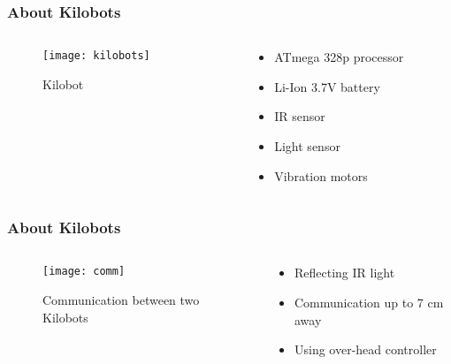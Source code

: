 \begin{frame}
	\frametitle{About Kilobots}
	\begin{columns}
		\begin{column}{0.4\textwidth}
			\begin{figure}
				\centering
				\texttt{[image: kilobots]}
				\caption{Kilobot}
			\end{figure}
		\end{column}
		
		\begin{column}{0.45\textwidth}
			\begin{itemize}
				\item ATmega 328p processor 
				\item Li-Ion 3.7V battery 
				\item IR sensor 
				\item Light sensor 
				\item Vibration motors
			\end{itemize}
		\end{column}
	\end{columns}
\end{frame}

\begin{frame}
	\frametitle{About Kilobots}
	\begin{columns}
		\begin{column}{0.4\textwidth}
			\begin{figure}
				\centering
				\texttt{[image: comm]}
				\caption{Communication between two Kilobots}
			\end{figure}
		\end{column}
		
		\begin{column}{0.45\textwidth}
			\begin{itemize}
				\item Reflecting IR light
				\item Communication up to 7 cm away 
				\item Using over-head controller
			\end{itemize}
		\end{column}
	\end{columns}
\end{frame}

